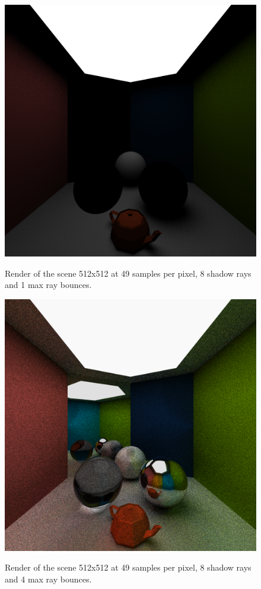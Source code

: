 \documentclass[a4paper, twocolumn]{article}
\begin{document}
            \begin{figure}[H]
                \centering
                \caption{Render of the scene 512x512 at 49 samples per pixel, 8 shadow rays and 1 max ray bounces.}
                \includegraphics[width=0.8\linewidth]{share/results/bounce_rays_1.png}
                \label{fig:bounces_1}
            \end{figure}

             \begin{figure}[H]
                \centering
                \caption{Render of the scene 512x512 at 49 samples per pixel, 8 shadow rays and 4 max ray bounces.}
                \includegraphics[width=0.8\linewidth]{share/results/bounce_rays_4.png}
                \label{fig:bounces_4}
            \end{figure}
\end{document}
